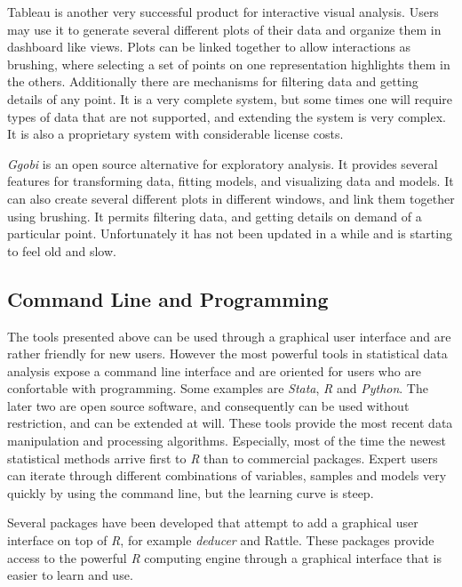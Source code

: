 Tableau \autocite{hanrahan_tableau_2003} is another very successful  product for interactive visual analysis. Users may use it to generate several different plots of their data and organize them in dashboard like views. Plots can be linked together to allow interactions as brushing, where selecting a set of points on one representation highlights them in the others. Additionally there are mechanisms for filtering data and getting details of any point. 
It is a very complete system, but some times one will require types of data that are not supported, and extending the system is very complex. It is also a proprietary system with considerable license costs. 

\emph{Ggobi} \autocite{cook_interactive_2007} is an open source alternative for exploratory analysis. It provides several features for transforming data, fitting models, and visualizing data and models. It can also create several different plots in different windows, and link them together using brushing. It permits filtering data, and getting details on demand of a particular point. Unfortunately it has not been updated in a while and is starting to feel old and slow.


\subsection{Command Line and Programming}

The tools presented above can be used through a graphical user interface and are rather friendly for new users. However the most powerful tools in statistical data analysis expose a command line interface and are oriented for users who are confortable with programming. Some examples are \emph{Stata}, \emph{R} \autocite{team_r:_2012} and \emph{Python}. The later two are open source software, and consequently can be used without restriction, and can be extended at will. These tools provide the most recent data manipulation and processing algorithms. Especially, most of the time the newest statistical methods arrive first to \emph{R} than to commercial packages. Expert users can iterate through different combinations of variables, samples and models very quickly by using the command line, but the learning curve is steep. 

Several packages have been developed that attempt to add a graphical user interface on top of \emph{R}, for example \emph{deducer} and Rattle. These packages provide access to the powerful \emph{R} computing engine through a graphical interface that is easier to learn and use. 

